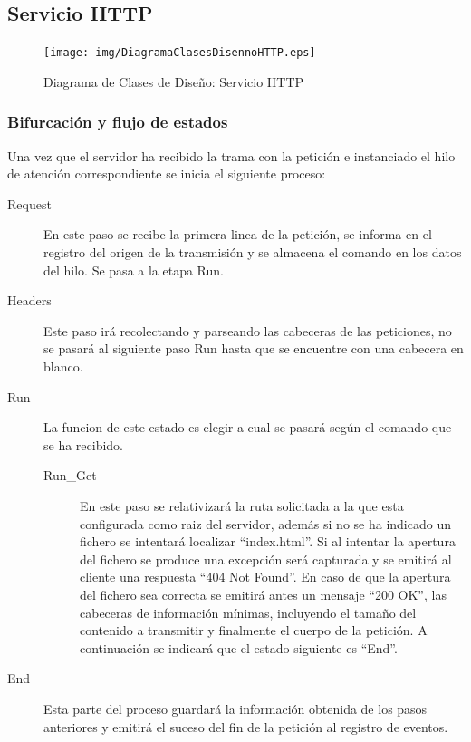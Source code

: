 \documentclass[a4paper,spanish,12pt]{book}
\begin{document}
\subsection{Servicio HTTP}

\begin{figure}[h]
		\begin{center}
				\texttt{[image: img/DiagramaClasesDisennoHTTP.eps]}	
			\end{center}
			\caption{Diagrama de Clases de Diseño: Servicio HTTP}
			  \label{fig:DiagramaClasesDisennoHTTP}
\end{figure}

\subsubsection{Bifurcación y flujo de estados} 
Una vez que el servidor ha recibido la trama con la petición e instanciado el hilo de atención correspondiente se inicia el siguiente proceso:
\begin{description}
	\item[Request] En este paso se recibe la primera linea de la petición, se informa en el registro del origen de la transmisión y se almacena el comando en los datos del hilo. Se pasa a la etapa Run.
	\item[Headers] Este paso irá recolectando y parseando las cabeceras de las peticiones, no se pasará al siguiente paso Run hasta que se encuentre con una cabecera en blanco.
	\item[Run] La funcion de este estado es elegir a cual se pasará según el comando que se ha recibido.
	\begin{description}
		\item[Run\_Get] En este paso se relativizará la ruta solicitada a la que esta configurada como raiz del servidor, además si no se ha indicado un fichero se intentará localizar ``index.html''. Si al intentar la apertura del fichero se produce una excepción será capturada y se emitirá al cliente una respuesta ``404 Not Found''. En caso de que la apertura del fichero sea correcta se emitirá antes un mensaje ``200 OK'', las cabeceras de información mínimas, incluyendo el tamaño del contenido a transmitir y finalmente el cuerpo de la petición. A continuación se indicará que el estado siguiente es ``End''.
	\end{description}
	\item[End] Esta parte del proceso guardará la información obtenida de los pasos anteriores y emitirá el suceso del fin de la petición al registro de eventos.
\end{description}
\end{document}
